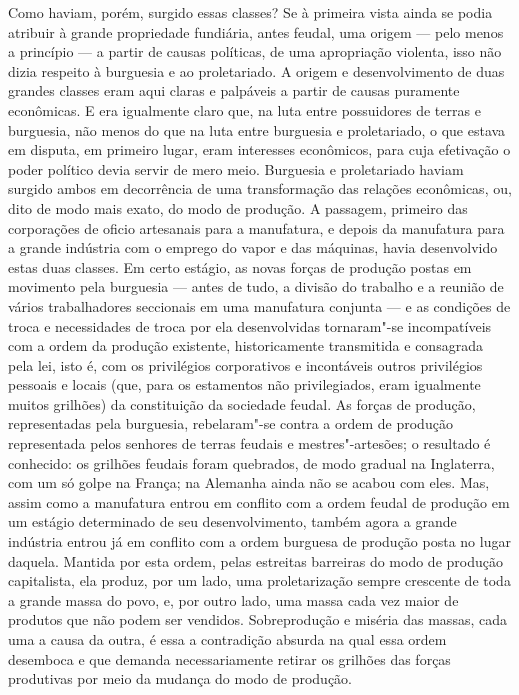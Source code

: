 Como haviam, porém, surgido essas classes? Se à primeira vista ainda
se podia atribuir à grande propriedade fundiária, antes feudal, uma
origem --- pelo menos a princípio --- a partir de causas políticas,
de uma apropriação violenta, isso não dizia respeito à burguesia
e ao proletariado. A origem e desenvolvimento de duas grandes classes
eram aqui claras e palpáveis a partir de causas puramente econômicas. E %
era igualmente claro que, na luta entre possuidores de terras e
burguesia, não menos do que na luta entre burguesia e proletariado, o
que estava em disputa, em primeiro lugar, eram interesses econômicos,
para cuja efetivação o poder político devia servir de mero meio.
Burguesia e proletariado haviam surgido ambos em decorrência de uma
transformação das relações econômicas, ou, dito de modo mais exato, do modo
de produção. A passagem, primeiro das corporações de oficio artesanais
para a manufatura, e depois da manufatura para a grande indústria com o
emprego do vapor e das máquinas, havia desenvolvido estas duas classes.
Em certo estágio, as novas forças de produção postas em movimento pela
burguesia --- antes de tudo, a divisão do trabalho e a reunião de vários
trabalhadores seccionais em uma manufatura conjunta --- e as condições de
troca e necessidades de troca por ela desenvolvidas tornaram"-se
incompatíveis com a ordem da produção existente, historicamente
transmitida e consagrada pela lei, isto é, com os privilégios
corporativos e incontáveis outros privilégios pessoais e locais (que,
para os estamentos não privilegiados, eram igualmente muitos grilhões)
da constituição da sociedade feudal. As forças de produção,
representadas pela burguesia, rebelaram"-se contra a ordem de produção
representada pelos senhores de terras feudais e mestres"-artesões; o
resultado é conhecido: os grilhões feudais foram quebrados, de modo gradual na Inglaterra, com um só golpe na França; na Alemanha ainda não se acabou com eles. Mas, assim como a manufatura entrou em conflito com a ordem feudal de produção em um estágio determinado de seu desenvolvimento, também agora a grande indústria entrou já em conflito com a
ordem burguesa de produção posta no lugar daquela. Mantida por esta
ordem, pelas estreitas barreiras do modo de produção capitalista, ela
produz, por um lado, uma proletarização sempre crescente de toda a
grande massa do povo, e, por outro lado, uma massa cada vez maior de
produtos que não podem ser vendidos. Sobreprodução e miséria das massas,
cada uma a causa da outra, é essa a contradição absurda na qual essa
ordem desemboca e que demanda necessariamente retirar os grilhões das
forças produtivas por meio da mudança do modo de produção.

